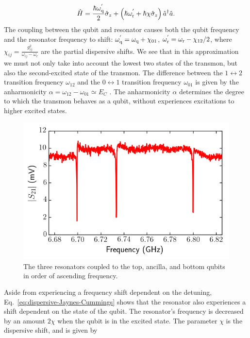         \begin{equation}
          \hat{H} = \frac{\hbar \omega_\text{q}^{'}}{2} \hat{\sigma}_z +  \left(\hbar \omega_\text{r}^{'} + \hbar \chi \hat{\sigma}_z\right) \hat{a}^\dagger \hat{a}.
          \label{eq:dispersive-Jaynes-Cummings}
        \end{equation}
        The coupling between the qubit and resonator causes both the qubit frequency and the resonator frequency to shift: $\omega_\text{q}^{'} = \omega_\text{q} + \chi_{01}$, $\omega_\text{r}^{'}=\omega_\text{r} - \chi_{12}/2$, where $\chi_{ij} = \frac{g_{ij}^2}{\omega_{ij}-\omega_r}$ are the partial dispersive shifts. We see that in this approximation we must not only take into account the lowest two states of the transmon, but also the second-excited state of the transmon. The difference between the $1\leftrightarrow 2$ transition frequency $\omega_{12}$ and the $0\leftrightarrow 1$ transition frequency $\omega_{01}$ is given by the anharmonicity $\alpha=\omega_{12} - \omega_{01} \simeq E_C$ \cite{koch2007Transmon}. The anharmonicity $\alpha$ determines the degree to which the transmon behaves as a qubit, without experiences excitations to higher excited states.

        \begin{figure}[h]
          \centering
          \includegraphics[width=.7\textwidth]{Figures/Qubit characterization/Resonator scans.png}
          \caption{The three resonators coupled to the top, ancilla, and bottom qubits in order of ascending frequency.}
          \label{fig:Three resonators}
        \end{figure}

        Aside from experiencing a frequency shift dependent on the detuning, Eq.~\ref{eq:dispersive-Jaynes-Cummings} shows that the resonator also experiences a shift dependent on the state of the qubit. The resonator's frequency is decreased by an amount $2 \chi$ when the qubit is in the excited state. The parameter $\chi$ is the dispersive shift, and is given by

